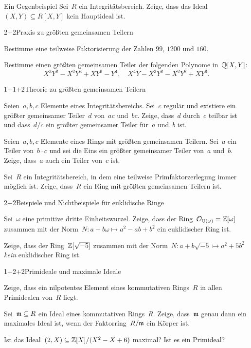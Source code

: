 \documentclass{algblatt}
\begin{document}

\begin{aufgabe}{3}{Ein Gegenbeispiel}
Sei~$R$ ein Integritätsbereich. Zeige, dass das Ideal~$(X,Y) \subseteq R[X,Y]$
kein Hauptideal ist.
\end{aufgabe}

\begin{aufgabeE}{2+2}{Praxis zu größten gemeinsamen Teilern}
\item Bestimme eine teilweise Faktorisierung der Zahlen $99$, $1200$ und $160$.
\item Bestimme einen größten gemeinsamen Teiler der folgenden Polynome
in~$\mathbb{Q}[X,Y]$:
\[ X^3Y^2 - X^2Y^3 + XY^3 - Y^4, \quad X^4Y - X^3Y^2 - X^2Y^2 + XY^3. \]
\end{aufgabeE}
\vspace{-1em}

\begin{aufgabeE}{1+1+2}{Theorie zu größten gemeinsamen Teilern}
\item Seien~$a,b,c$ Elemente eines Integritätsbereichs. Sei~$c$ regulär und
existiere ein größter gemeinsamer Teiler~$d$ von~$ac$ und~$bc$. Zeige, dass~$d$
durch~$c$ teilbar ist und dass~$d/c$ ein größter gemeinsamer Teiler für~$a$
und~$b$ ist.
\item Seien~$a,b,c$ Elemente eines Rings mit größten gemeinsamen Teilern.
Sei~$a$ ein Teiler von~$b \cdot c$ und sei die Eins ein größter gemeinsamer
Teiler von~$a$ und~$b$. Zeige, dass~$a$ auch ein Teiler von~$c$ ist.
\item Sei~$R$ ein Integritätsbereich, in dem eine teilweise Primfaktorzerlegung
immer möglich ist. Zeige, dass~$R$ ein Ring mit größten gemeinsamen Teilern
ist.
\end{aufgabeE}

\begin{aufgabeE}{2+2}{Beispiele und Nichtbeispiele für euklidische Ringe}
\item Sei~$\omega$ eine primitive dritte Einheitswurzel. Zeige, dass der
Ring~$\mathcal{O}_{\mathbb{Q}(\omega)} = \mathbb{Z}[\omega]$ zusammen mit der Norm~$N : a+b\omega
\mapsto a^2 - ab + b^2$ ein euklidischer Ring ist.
\item Zeige, dass der Ring~$\mathbb{Z}[\sqrt{-5}]$ zusammen mit der Norm~$N :
a+b\sqrt{-5} \mapsto a^2 + 5b^2$ \emph{kein} euklidischer Ring ist.
\end{aufgabeE}

\begin{aufgabeE}{1+2+2}{Primideale und maximale Ideale}
\item Zeige, dass ein nilpotentes Element eines kommutativen Rings~$R$ in allen
Primidealen von~$R$ liegt.
\item Sei~$\mathfrak{m} \subseteq R$ ein Ideal eines kommutativen Rings~$R$. Zeige,
dass~$\mathfrak{m}$ genau dann ein maximales Ideal ist, wenn der Faktorring~$R/\mathfrak{m}$ ein
Körper ist.
\item Ist das Ideal~$(2, X) \subseteq \mathbb{Z}[X]/(X^2-X+6)$ maximal? Ist es ein
Primideal?
\end{aufgabeE}
\end{document}
